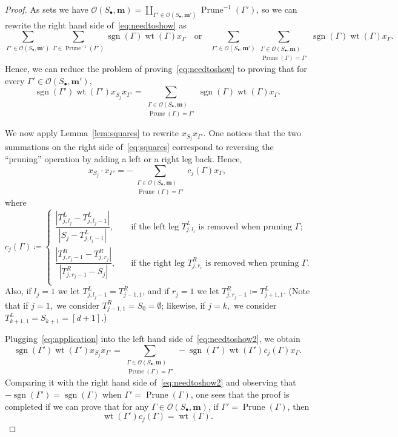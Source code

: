 \documentclass[10pt,a4paper]{amsart}
\theoremstyle{definition}
\newcommand{\bm}[1]{{\boldsymbol{#1}}}
\newcommand\m{\bm{m}}
\DeclareMathOperator{\wt}{wt}
\DeclareMathOperator{\prune}{Prune}
\DeclareMathOperator{\sgn}{sgn}
\newcommand{\D}{{\Gamma}}
\newcommand{\lspd}{\mathcal O}
\begin{document}
\begin{proof}
	As sets we have $\lspd(S_\bullet,\m)=\coprod_{\D'\in \lspd(S_\bullet,\m')} \prune^{-1}(\D')$, %
	so we can rewrite the right hand side of~\eqref{eq:needtoshow} as
	\[ \sum_{\D'\in\lspd(S_\bullet,\m')}\sum_{\D\in\prune^{-1}(\D')}\sgn(\D)\wt(\D)x_\D \quad \text{or} \quad \sum_{\D'\in\lspd(S_\bullet,\m')} \sum_{\substack{\D\in\lspd(S_\bullet,\m)\\ \prune(\D)=\D'}} \sgn(\D)\wt(\D)x_\D.\]
	Hence, we can reduce the problem of proving~\eqref{eq:needtoshow} to proving that for every $\D' \in \lspd(S_\bullet, \m'),$ 
	\begin{equation}\label{eq:needtoshow2}
	\sgn(\D')\wt(\D')x_{S_j}x_{\D'} = \sum_{\substack{\D\in\lspd(S_\bullet,\m)\\ \prune(\D)=\D'}} \sgn(\D)\wt(\D)x_\D.
	\end{equation}
	
	We now apply Lemma~\ref{lem:squares} to rewrite $x_{S_j} x_{\D'}$. One notices that the two summations on the right side of~\eqref{eq:squares} correspond to reversing the ``pruning'' operation by adding a left or a right leg back. Hence,
	\begin{equation}\label{eq:application}
	x_{S_j}\cdot x_{\D'} = -\sum_{\substack{\D\in\lspd(S_\bullet,\m)\\ \prune(\D)=\D'}} c_j(\D) x_\D,
	\end{equation}
	where %
	\[ c_j(\D) \coloneqq \begin{cases}
	\dfrac{|T^L_{j,l_j}-T^L_{j,l_j-1}|}{|S_j-T^L_{j,l_j-1}|}, & \quad 
	\text{if the left leg $T^L_{j,l_i}$ is removed when pruning $\D$;} \\
	\dfrac{|T^R_{j,r_j-1}-T^R_{j,r_j}|}{|T^R_{j,r_j-1}-S_j|}, & \quad 
	\text{if the right leg $T^R_{j,r_i}$ is removed when pruning $\D$.} \\
	\end{cases}
	\]
	Also, if $l_j=1$ we let $T^L_{j, l_j-1} = T^R_{j-1, 1}$, and if $r_j=1$ we let $T^R_{j, r_j-1} \coloneqq T^L_{j+1,1}.$ (Note that if $j=1,$ we consider $T^R_{j-1,1} = S_0 = \emptyset$; likewise, if $j=k,$ we consider $T^L_{k+1,1} = S_{k+1} = [d+1].$) 
	
	Plugging~\eqref{eq:application} into the left hand side of~\eqref{eq:needtoshow2}, we obtain
	\begin{equation}\label{eq:application2}
	\sgn(\D')\wt(\D')x_{S_j}x_{\D'} = \sum_{\substack{\D\in\lspd(S_\bullet,\m)\\ \prune(\D)=\D'}} - \sgn(\D')\wt(\D')c_j(\D) x_\D.
	\end{equation}
	Comparing it with the right hand side of~\eqref{eq:needtoshow2} and observing that $-\sgn(\D')=\sgn(\D)$ when $\D' =\prune(\D)$, one sees that the proof is completed if we can prove that for any $\D \in \lspd(S_\bullet,\m)$, if $\D'=\prune(\D)$, then
	\begin{equation}\label{eq:comparison2}
	\wt(\D')c_j(\D)=\wt(\D).
	\end{equation}
	

\end{proof}
\end{document}
